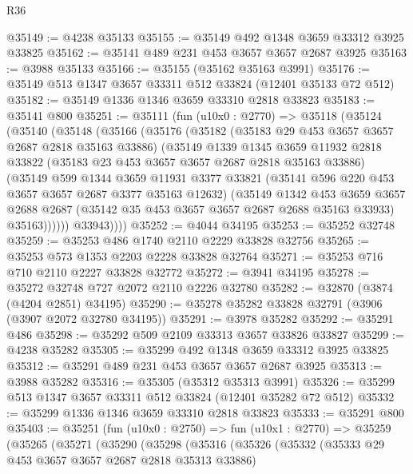 \begin{lexlean}{R36}
\begin{coremodule}
@35149 := @4238 @35133
@35155 := @35149 @492 @1348 @3659 @33312 @3925 @33825
@35162 := @35141 @489 @231 @453 @3657 @3657 @2687 @3925
@35163 := @3988 @35133
@35166 := @35155 (@35162 @35163 @3991)
@35176 := @35149 @513 @1347 @3657 @33311 @512 @33824 (@12401 @35133 @72 @512)
@35182 := @35149 @1336 @1346 @3659 @33310 @2818 @33823
@35183 := @35141 @800
@35251 := @35111
    (fun (u10x0 : @2770) =>
    @35118
      (@35124
        (@35140
          (@35148
            (@35166
              (@35176
                (@35182
                  (@35183 @29 @453 @3657 @3657 @2687 @2818 @35163 @33886)
                  (@35149
                    @1339
                    @1345
                    @3659
                    @11932
                    @2818
                    @33822
                    (@35183 @23 @453 @3657 @3657 @2687 @2818 @35163 @33886)
                    (@35149
                      @599
                      @1344
                      @3659
                      @11931
                      @3377
                      @33821
                      (@35141 @596 @220 @453 @3657 @3657 @2687 @3377 @35163 @12632)
                      (@35149
                        @1342
                        @453
                        @3659
                        @3657
                        @2688
                        @2687
                        (@35142 @35 @453 @3657 @3657 @2687 @2688 @35163 @33933)
                        @35163))))))
            @33943))))
@35252 := @4044 @34195
@35253 := @35252 @32748
@35259 := @35253 @486 @1740 @2110 @2229 @33828 @32756
@35265 := @35253 @573 @1353 @2203 @2228 @33828 @32764
@35271 := @35253 @716 @710 @2110 @2227 @33828 @32772
@35272 := @3941 @34195
@35278 := @35272 @32748 @727 @2072 @2110 @2226 @32780
@35282 := @32870 (@3874 (@4204 @2851) @34195)
@35290 := @35278 @35282 @33828 @32791 (@3906 (@3907 @2072 @32780 @34195))
@35291 := @3978 @35282
@35292 := @35291 @486
@35298 := @35292 @509 @2109 @33313 @3657 @33826 @33827
@35299 := @4238 @35282
@35305 := @35299 @492 @1348 @3659 @33312 @3925 @33825
@35312 := @35291 @489 @231 @453 @3657 @3657 @2687 @3925
@35313 := @3988 @35282
@35316 := @35305 (@35312 @35313 @3991)
@35326 := @35299 @513 @1347 @3657 @33311 @512 @33824 (@12401 @35282 @72 @512)
@35332 := @35299 @1336 @1346 @3659 @33310 @2818 @33823
@35333 := @35291 @800
@35403 := @35251
    (fun (u10x0 : @2750) =>
    fun (u10x1 : @2770) =>
    @35259
      (@35265
        (@35271
          (@35290
            (@35298
              (@35316
                (@35326
                  (@35332
                    (@35333 @29 @453 @3657 @3657 @2687 @2818 @35313 @33886)

\end{coremodule}
\end{lexlean}
